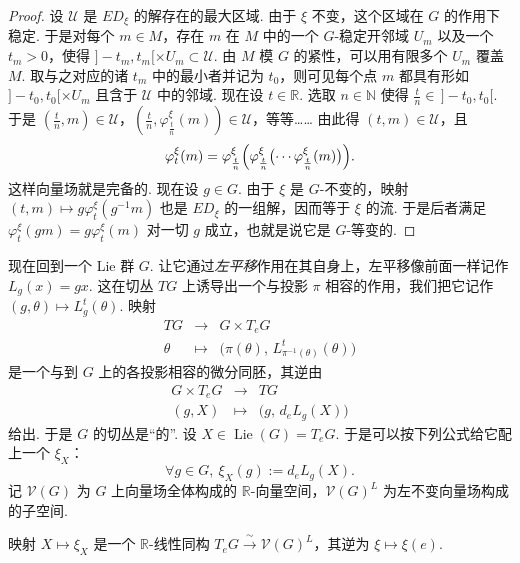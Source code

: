 \begin{proof}
设 $\mathcal U$ 是 $ED_{\xi}$ 的解存在的最大区域. 由于 $\xi$ 不变，这个区域在 $G$ 的作用下稳定. 于是对每个 $m\in M$，存在 $m$ 在 $M$ 中的一个 $G$-稳定开邻域 $U_{m}$ 以及一个 $t_{m}>0$，使得 $]-t_{m},t_{m}[\times U_{m}\subset\mathcal U$. 由 $M$ 模 $G$ 的紧性，可以用有限多个 $U_{m}$ 覆盖 $M$. 取与之对应的诸 $t_{m}$ 中的最小者并记为 $t_{0}$，则可见每个点 $m$ 都具有形如 $]-t_{0},t_{0}[\times U_{m}$ 且含于 $\mathcal U$ 中的邻域. 现在设 $t\in\mathbb R$. 选取 $n\in\mathbb N$ 使得 $\frac{t}{n}\in\,]-t_{0},t_{0}[$. 于是 $(\frac{t}{n},m)\in\mathcal U$，$(\frac{t}{n},\varphi^{\xi}_{\frac{t}{n}}(m))\in\mathcal U$，等等…… 由此得 $(t,m)\in\mathcal U$，且
\[
\varphi^{\xi}_{t}(m)=\varphi^{\xi}_{\frac{t}{n}}\Bigl(\varphi^{\xi}_{\frac{t}{n}}\bigl(\cdots\varphi^{\xi}_{\frac{t}{n}}(m)\bigr)\Bigr).
\]
这样向量场就是完备的. 现在设 $g\in G$. 由于 $\xi$ 是 $G$-不变的，映射 $(t,m)\mapsto g\varphi^{\xi}_{t}(g^{-1}m)$ 也是 $ED_{\xi}$ 的一组解，因而等于 $\xi$ 的流. 于是后者满足 $\varphi^{\xi}_{t}(gm)=g\varphi^{\xi}_{t}(m)$ 对一切 $g$ 成立，也就是说它是 $G$-等变的.
\end{proof}

\begin{numpara}[$G$ 上左不变的向量场]\label{np:lie-1-7-5}
现在回到一个 Lie 群 $G$. 让它通过\emph{左平移}作用在其自身上，左平移像前面一样记作 $L_{g}(x)=gx$. 这在切丛 $TG$ 上诱导出一个与投影 $\pi$ 相容的作用，我们把它记作 $(g,\theta)\mapsto L^{t}_{g}(\theta)$. 映射
\[
\begin{array}{rcl}
TG & \longrightarrow & G\times T_{e}G\\
\theta & \longmapsto & \bigl(\pi(\theta),\,L^{t}_{\pi^{-1}(\theta)}(\theta)\bigr)
\end{array}
\]
是一个与到 $G$ 上的各投影相容的微分同胚，其逆由
\[
\begin{array}{rcl}
G\times T_{e}G & \longrightarrow & TG\\
(g,X) & \longmapsto & \bigl(g,\,d_{e}L_{g}(X)\bigr)
\end{array}
\]
给出. 于是 $G$ 的切丛是``的''. 设 $X\in\operatorname{Lie}(G)=T_{e}G$. 于是可以按下列公式给它配上一个 $\xi_{X}$：
\[
\forall g\in G,\ \xi_{X}(g):=d_{e}L_{g}(X).
\]
记 $\mathcal V(G)$ 为 $G$ 上向量场全体构成的 $\mathbb R$-向量空间，$\mathcal V(G)^{L}$ 为左不变向量场构成的子空间.
\end{numpara}

\begin{lemma*}
映射 $X\mapsto\xi_{X}$ 是一个 $\mathbb R$-线性同构 $T_{e}G\xrightarrow{\ \sim\ }\mathcal V(G)^{L}$，其逆为 $\xi\mapsto\xi(e)$.
\end{lemma*}

